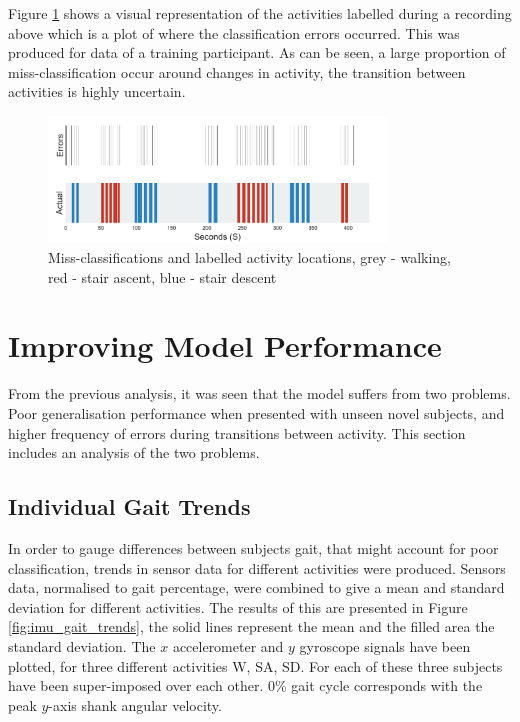 \documentclass[sensors,article,submit,moreauthors,pdftex]{Definitions/mdpi}
\begin{document}
Figure \ref{fig:missclassification} shows a visual representation of the activities labelled during a recording above which is a plot of where the classification errors occurred. This was produced for data of a training participant. As can be seen, a large proportion of miss-classification occur around changes in activity, the transition between activities is highly uncertain.

\begin{figure}[!htb]
    \centering
    \includegraphics[width=0.8\textwidth]{Figures/results/location_of_errors.jpg}
    \caption{Miss-classifications and labelled activity locations, grey - walking, red - stair ascent, blue - stair descent}
    \label{fig:missclassification}
\end{figure}



\section{Improving Model Performance}
\label{sec:improving_perfromance}

From the previous analysis, it was seen that the model suffers from two problems. Poor generalisation performance when presented with unseen novel subjects, and higher frequency of errors during transitions between activity. This section includes an analysis of the two problems.

\subsection{Individual Gait Trends}
In order to gauge differences between subjects gait, that might account for poor classification, trends in sensor data for different activities were produced. Sensors data, normalised to gait percentage, were combined to give a mean and standard deviation for different activities. The results of this are presented in Figure \ref{fig:imu_gait_trends}, the solid lines represent the mean and the filled area the standard deviation. The $x$ accelerometer and $y$ gyroscope signals have been plotted, for three different activities W, SA, SD. For each of these three subjects have been super-imposed over each other. 0\% gait cycle corresponds with the peak $y$-axis shank angular velocity.
\end{document}
